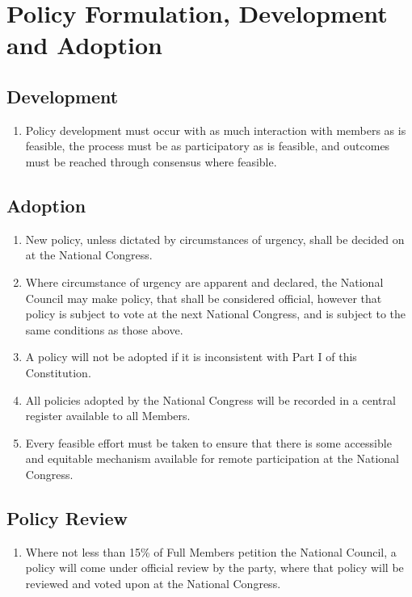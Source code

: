 \documentclass[a4paper,titlepage,8.5pt]{article}
\begin{document}
\section{Policy Formulation, Development and Adoption}

\subsection{Development}

\begin{enumerate}
\item Policy development must occur with as much interaction with members as is feasible, the process must be as participatory as is feasible, and outcomes must be reached through consensus where feasible.
\end{enumerate}

\subsection{Adoption}

\begin{enumerate}
\item New policy, unless dictated by circumstances of urgency, shall be decided on at the National Congress.
\item Where circumstance of urgency are apparent and declared, the National Council may make policy, that shall be considered official, however that policy is subject to vote at the next National Congress, and is subject to the same conditions as those above.
\item A policy will not be adopted if it is inconsistent with Part I of this Constitution.
\item All policies adopted by the National Congress will be recorded in a central register available to all Members.
\item Every feasible effort must be taken to ensure that there is some accessible and equitable mechanism available for remote participation at the National Congress.
\end{enumerate}

\subsection{Policy Review}

\begin{enumerate}
\item Where not less than 15\% of Full Members petition the National Council, a policy will come under official review by the party, where that policy will be reviewed and voted upon at the National Congress.
\end{enumerate}
\end{document}
